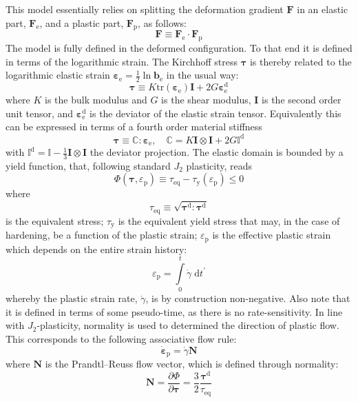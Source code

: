 \documentclass[garamond]{goose-article}
\newcommand\T[1]{\bm{{#1}}}
\newcommand\TT[1]{\mathbb{{#1}}}
\begin{document}
This model essentially relies on splitting the deformation gradient $\T{F}$ in an elastic part, $\T{F}_\mathrm{e}$, and a plastic part, $\T{F}_\mathrm{p}$, as follows:
\begin{equation}
  \T{F} \equiv \T{F}_\mathrm{e} \cdot \T{F}_\mathrm{p}
\end{equation}
The model is fully defined in the deformed configuration. To that end it is defined in terms of the logarithmic strain. The Kirchhoff stress $\T{\tau}$ is thereby related to the logarithmic elastic strain $\T{\varepsilon}_\mathrm{e} = \tfrac{1}{2} \ln \T{b}_\mathrm{e}$ in the usual way:
\begin{equation}
  \T{\tau} \equiv K \mathrm{tr} \left( \T{\varepsilon}_\mathrm{e} \right) \T{I} + 2 G \T{\varepsilon}_\mathrm{e}^\mathrm{d}
\end{equation}
where $K$ is the bulk modulus and $G$ is the shear modulus, $\T{I}$ is the second order unit tensor, and $\T{\varepsilon}_\mathrm{e}^\mathrm{d}$ is the deviator of the elastic strain tensor. Equivalently this can be expressed in terms of a fourth order material stiffness
\begin{equation}
  \T{\tau} \equiv \TT{C} : \T{\varepsilon}_\mathrm{e},
  \quad
  \TT{C} = K \T{I} \otimes \T{I} + 2 G \TT{I}^\mathrm{d}
\end{equation}
with $\TT{I}^\mathrm{d} = \TT{I} - \tfrac{1}{3} \T{I} \otimes \T{I}$ the deviator projection. The elastic domain is bounded by a yield function, that, following standard $J_2$ plasticity, reads
\begin{equation}
  \Phi(\T{\tau}, \varepsilon_\mathrm{p}) \equiv \tau_\mathrm{eq} - \tau_\mathrm{y}(\varepsilon_\mathrm{p}) \leq 0
\end{equation}
where
\begin{equation}
  \tau_\mathrm{eq} \equiv \sqrt{ \T{\tau}^\mathrm{d} : \T{\tau}^\mathrm{d} }
\end{equation}
is the equivalent stress; $\tau_\mathrm{y}$ is the equivalent yield stress that may, in the case of hardening, be a function of the plastic strain; $\varepsilon_\mathrm{p}$ is the effective plastic strain which depends on the entire strain history:
\begin{equation}
  \varepsilon_\mathrm{p} = \int\limits_0^t \dot{\gamma} \;\mathrm{d}t^\prime
  \label{eq:history}
\end{equation}
whereby the plastic strain rate, $\dot{\gamma}$, is by construction non-negative. Also note that it is defined in terms of some pseudo-time, as there is no rate-sensitivity. In line with $J_2$-plasticity, normality is used to determined the direction of plastic flow. This corresponds to the following associative flow rule:
\begin{equation}
  \dot{\bm{\varepsilon}}_\mathrm{p} = \dot{\gamma} \bm{N}
  \label{eq:flow-rule}
\end{equation}
where $\bm{N}$ is the Prandtl--Reuss flow vector, which is defined through normality:
\begin{equation}
  \bm{N}
  = \frac{\partial \Phi}{\partial \T{\tau}}
  = \frac{3}{2} \frac{\T{\tau}^\mathrm{d}}{\tau_\mathrm{eq}}
\end{equation}
\end{document}
